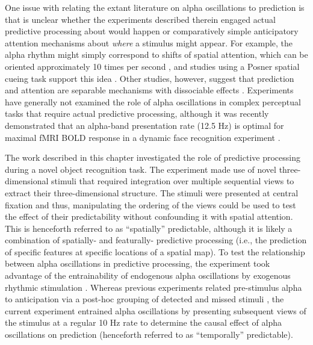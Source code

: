 \documentclass[dwyatte_dissertation.tex]{subfiles}
\begin{document}
One issue with relating the extant literature on alpha oscillations to prediction is that is unclear whether the experiments described therein engaged actual predictive processing about  would happen or comparatively simple anticipatory attention mechanisms about \textit{where} a stimulus might appear. For example, the alpha rhythm might simply correspond to shifts of spatial attention, which can be oriented approximately 10 times per second \cite{VanRullenDubois11}, and studies using a Posner spatial cueing task \cite{Posner80} support this idea \cite{CapotostoBabiloniRomaniEtAl09,BuschVanRullen10}. Other studies, however, suggest that prediction and attention are separable mechanisms with dissociable effects \cite{KokRahnevJeheeEtAl12,WyartNobreSummerfield12,HorschigJensenVanSchouwenburgEtAl13}. Experiments have generally not examined the role of alpha oscillations in complex perceptual tasks that require actual predictive processing, although it was recently demonstrated that an alpha-band presentation rate (12.5 Hz) is optimal for maximal fMRI BOLD response in a dynamic face recognition experiment \cite{SchultzBrockhausBulthoffEtAl13}.

The work described in this chapter investigated the role of predictive processing during a novel object recognition task. The experiment made use of novel three-dimensional stimuli that required integration over multiple sequential views to extract their three-dimensional structure. The stimuli were presented at central fixation and thus, manipulating the ordering of the views could be used to test the effect of their predictability without confounding it with spatial attention. This is henceforth referred to as ``spatially'' predictable, although it is likely a combination of spatially- and featurally- predictive processing (i.e., the prediction of specific features at specific locations of a spatial map). To test the relationship between alpha oscillations in predictive processing, the experiment took advantage of the entrainability of endogenous alpha oscillations by exogenous rhythmic stimulation \cite{SchroederLakatosKajikawaEtAl08,CalderoneLakatosButlerEtAlInPress}. Whereas previous experiments related pre-stimulus alpha to  anticipation via a post-hoc grouping of detected and missed stimuli \cite{MathewsonGrattonFabianiEtAl09,BuschDuboisVanrullen09}, the current experiment entrained alpha oscillations by presenting subsequent views of the stimulus at a regular 10 Hz rate to determine the causal effect of alpha oscillations on prediction (henceforth referred to as ``temporally'' predictable).
\end{document}
